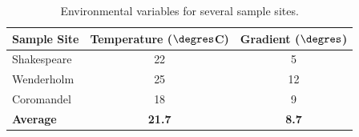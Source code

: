 \documentclass[12pt]{article} %
\begin{document}
\begin{table}[!ht]
	\centering
	\begin{tabular}{lcc}
		\toprule
		\textbf{Sample Site} & \textbf{Temperature ($\degres$C)} & \textbf{Gradient ($\degres$)}\\
		\midrule
		Shakespeare & 22 & 5\\
		Wenderholm & 25 & 12\\
		Coromandel & 18 & 9\\
		\midrule
		\textbf{Average} & \textbf{21.7} & \textbf{8.7}\\
		\bottomrule
	\end{tabular}
	\caption{Environmental variables for several sample sites.}
	\label{tab:env}
\end{table}




\end{document}
